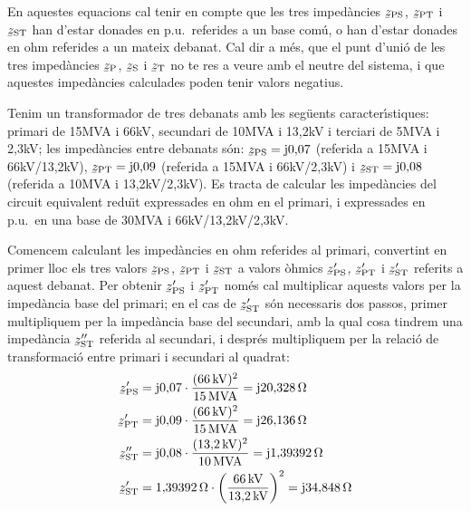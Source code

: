 En aquestes equacions cal tenir en compte que les tres imped\`{a}ncies $\cmplx{z}\ped{PS}$, $\cmplx{z}\ped{PT}$ i $\cmplx{z}\ped{ST}$ han d'estar donades en p.u.\ referides a un base com\'{u}, o han d'estar donades en ohm referides a un mateix debanat. Cal dir a m\'{e}s, que el punt d'uni\'{o} de les tres imped\`{a}ncies $\cmplx{z}\ped{P}$, $\cmplx{z}\ped{S}$ i $\cmplx{z}\ped{T}$ no te res a veure amb el neutre del sistema, i que aquestes imped\`{a}ncies calculades poden tenir valors  negatius.


\begin{exemple}
    Tenim un transformador de tres debanats amb les seg\"{u}ents caracter\'{\i}stiques: primari de 15\unit{MVA} i 66\unit{kV}, secundari de 10\unit{MVA} i 13,2\unit{kV} i terciari de 5\unit{MVA} i 2,3\unit{kV}; les imped\`{a}ncies entre debanats s\'{o}n: $\cmplx{z}\ped{PS} = \ju 0{,}07$ (referida a 15\unit{MVA} i 66\unit{kV}/13,2\unit{kV}), $\cmplx{z}\ped{PT} = \ju 0{,}09$ (referida a 15\unit{MVA} i 66\unit{kV}/2,3\unit{kV}) i $\cmplx{z}\ped{ST} = \ju 0{,}08$ (referida a 10\unit{MVA} i 13,2\unit{kV}/2,3\unit{kV}).  Es tracta de calcular les imped\`{a}ncies del circuit equivalent redu\"{\i}t expressades en ohm en el primari, i expressades en p.u.\ en una base de 30\unit{MVA} i 66\unit{kV}/13,2\unit{kV}/2,3\unit{kV}.

    Comencem calculant les imped\`{a}ncies en ohm referides al primari, convertint en primer lloc els tres valors $\cmplx{z}\ped{PS}$, $\cmplx{z}\ped{PT}$ i $\cmplx{z}\ped{ST}$ a valors \`{o}hmics $\cmplx{z}\ped{PS}'$, $\cmplx{z}\ped{PT}'$ i $\cmplx{z}\ped{ST}'$ referits a aquest debanat. Per obtenir $\cmplx{z}\ped{PS}'$ i $\cmplx{z}\ped{PT}'$ nom\'{e}s cal multiplicar aquests valors per la imped\`{a}ncia base del primari; en el cas de $\cmplx{z}\ped{ST}'$ s\'{o}n necessaris dos passos, primer multipliquem per la imped\`{a}ncia base del secundari, amb la qual cosa tindrem una imped\`{a}ncia $\cmplx{z}\ped{ST}''$ referida al secundari,  i despr\'{e}s multipliquem per la relaci\'{o} de transformaci\'{o} entre primari i secundari al quadrat:
    \begin{align*}
        \cmplx{z}\ped{PS}' &=  \ju 0{,}07 \cdot \frac{(66\unit{kV})^2}{15\unit{MVA}} = \ju 20{,}328\unit{\ohm}\\
        \cmplx{z}\ped{PT}' &=  \ju 0{,}09 \cdot \frac{(66\unit{kV})^2}{15\unit{MVA}} = \ju 26{,}136\unit{\ohm}\\
        \cmplx{z}\ped{ST}'' &=  \ju 0{,}08 \cdot \frac{(13{,}2\unit{kV})^2}{10\unit{MVA}} = \ju 1{,}39392\unit{\ohm}\\
        \cmplx{z}\ped{ST}' &=  1{,}39392\unit{\ohm} \cdot {\left(\frac{66\unit{kV}}{13{,}2\unit{kV}}\right)}^2 = \ju 34{,}848\unit{\ohm}
    \end{align*}


\end{exemple}
